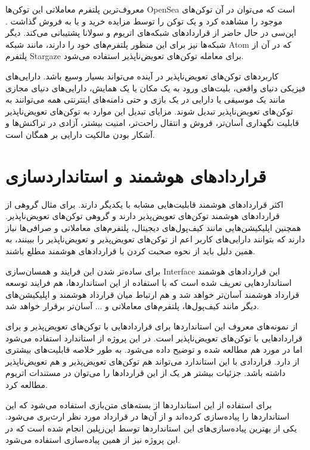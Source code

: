 معروف‌ترین پلتفرم معاملاتی این توکن‌ها
\gls{OpenSea}
است که می‌توان در آن توکن‌های موجود را مشاهده کرد و یک توکن را توسط مزایده خرید و یا به فروش گذاشت
\cite{OpenSeaDocs}.
اپن‌سی در حال حاضر از قراردادهای شبکه‌های اتریوم و سولانا پشتیبانی می‌کند.
دیگر شبکه‌ها نیز برای این منظور پلتفرم‌های خود را دارند، مانند شبکه
\gls{Atom}
که در آن از پلتفرم
\gls{Stargaze}
برای معامله توکن‌های تعویض‌ناپذیر استفاده می‌شود.

کاربردهای توکن‌های تعویض‌ناپذیر در آینده می‌تواند بسیار وسیع باشد.
دارایی‌های فیزیکی دنیای واقعی، بلیت‌های ورود به یک مکان یا یک همایش،
دارایی‌های دنیای مجازی مانند یک موسیقی یا دارایی در یک بازی
و حتی دامنه‌های اینترنتی همه می‌توانند به توکن‌های تعویض‌ناپذیر تبدیل شوند.
مزایای تبدیل این موارد به توکن‌های تعویض‌ناپذیر قابلیت نگهداری آسان‌تر،
فروش و انتقال راحت‌تر، امنیت بیشتر، آزادی در تراکنش‌ها
و آشکار بودن مالکیت دارایی بر همگان است.


\section{قرارداد‌های هوشمند و استانداردسازی}
اکثر قرارداد‌های هوشمند قابلیت‌هایی مشابه با یکدیگر دارند.
برای مثال گروهی از قرارداد‌های هوشمند توکن‌های تعویض‌پذیر دارند
و گروهی توکن‌های تعویض‌ناپذیر.
همچنین اپلیکیشن‌هایی مانند کیف‌پول‌های دیجیتال،
پلتفرم‌های معاملاتی و صرافی‌ها
نیاز دارند که بتوانند دارایی‌های کاربر
اعم از توکن‌های تعویض‌پذیر و تعویض‌ناپذیر را ببینند،
به همین دلیل باید از نحوه صحبت کردن با قراردادهای هوشمند مطلع باشند.

برای ساده‌تر شدن این فرایند
و همسان‌سازی
\gls{Interface}
این قراردادهای هوشمند استانداردهایی تعریف شده است
که با استفاده از این استانداردها، هم فرایند توسعه قرارداد هوشمند آسان‌تر خواهد شد
و هم ارتباط میان قرارداد هوشمند و اپلیکیشن‌های دیگر مانند کیف‌پول‌ها، پلتفرم‌های معاملاتی و ... آسان‌تر برقرار خواهد شد.

از نمونه‌های معروف این استانداردها
برای قرارداد‌هایی با توکن‌های تعویض‌پذیر و
برای قراردادهایی با توکن‌های تعویض‌ناپذیر است. در این پروژه از استاندارد
استفاده می‌شود اما در مورد
هم مطالعه شده و توضیح داده می‌شود.
به طور خلاصه
قابلیت‌های بیشتری از
دارد.
قراردادی با این استاندارد می‌تواند هم توکن‌های تعویض‌پذیر و هم تعویض‌ناپذیر داشته باشد.
جزئیات بیشتر هر یک از این قراردادها را می‌توان در مستندات اتریوم
\cite{EthereumDocs}
مطالعه کرد.

برای استفاده از این استاندارد‌ها از بسته‌های متن‌بازی استفاده می‌شود که این استاندارد‌ها را پیاده‌سازی کرده‌اند
و از آن‌ها در قرارداد مورد نظر ارث‌بری می‌شود.
یکی از بهترین پیاده‌سازی‌های این استاندارد‌ها توسط اپن‌زپلین
\cite{ZeppelinDocs}
انجام شده است که در این پروژه نیز از همین پیاده‌سازی استفاده می‌شود.

